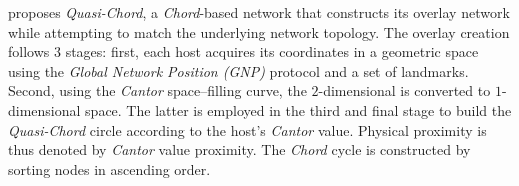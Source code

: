\cite{SZ2008} proposes \emph{Quasi-Chord}, a \emph{Chord}-based network that
constructs its overlay network while attempting to match the underlying 
network topology.
The overlay creation follows $3$ stages:
first, each host acquires its coordinates in
a geometric space using the \emph{Global Network Position (GNP)} protocol
\cite{ng_gnp_2001} and a set of landmarks.
Second, using the \emph{Cantor} space--filling curve, 
the $2$-dimensional is converted to $1$-dimensional space. 
The latter is employed in the third and final stage to build 
the \emph{Quasi-Chord} circle according to the host's \emph{Cantor} value. 
Physical proximity is thus denoted by \emph{Cantor} value proximity. 
The \emph{Chord} cycle is constructed by sorting nodes in 
ascending order.
%
%
%
